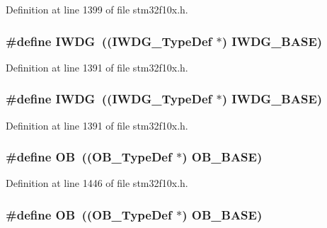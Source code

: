 Definition at line 1399 of file stm32f10x.\+h.

\subsubsection[{\texorpdfstring{I\+W\+DG}{IWDG}}]{\setlength{\rightskip}{0pt plus 5cm}\#define I\+W\+DG~(({\bf I\+W\+D\+G\+\_\+\+Type\+Def} $\ast$) {\bf I\+W\+D\+G\+\_\+\+B\+A\+SE})}\hypertarget{group___peripheral__declaration_gad16b79dd94ee85d261d08a8ee94187e7}{}\label{group___peripheral__declaration_gad16b79dd94ee85d261d08a8ee94187e7}


Definition at line 1391 of file stm32f10x.\+h.

\subsubsection[{\texorpdfstring{I\+W\+DG}{IWDG}}]{\setlength{\rightskip}{0pt plus 5cm}\#define I\+W\+DG~(({\bf I\+W\+D\+G\+\_\+\+Type\+Def} $\ast$) {\bf I\+W\+D\+G\+\_\+\+B\+A\+SE})}\hypertarget{group___peripheral__declaration_gad16b79dd94ee85d261d08a8ee94187e7}{}\label{group___peripheral__declaration_gad16b79dd94ee85d261d08a8ee94187e7}


Definition at line 1391 of file stm32f10x.\+h.

\subsubsection[{\texorpdfstring{OB}{OB}}]{\setlength{\rightskip}{0pt plus 5cm}\#define OB~(({\bf O\+B\+\_\+\+Type\+Def} $\ast$) {\bf O\+B\+\_\+\+B\+A\+SE})}\hypertarget{group___peripheral__declaration_gad2d5f875cdc6d696735f20fa23a895c3}{}\label{group___peripheral__declaration_gad2d5f875cdc6d696735f20fa23a895c3}


Definition at line 1446 of file stm32f10x.\+h.

\subsubsection[{\texorpdfstring{OB}{OB}}]{\setlength{\rightskip}{0pt plus 5cm}\#define OB~(({\bf O\+B\+\_\+\+Type\+Def} $\ast$) {\bf O\+B\+\_\+\+B\+A\+SE})}\hypertarget{group___peripheral__declaration_gad2d5f875cdc6d696735f20fa23a895c3}{}\label{group___peripheral__declaration_gad2d5f875cdc6d696735f20fa23a895c3}


